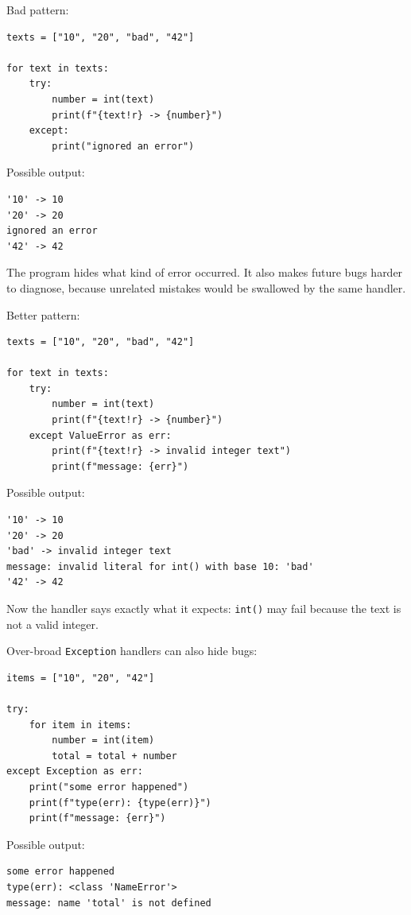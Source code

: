 \documentclass[a4paper,twoside]{report}
\begin{document}
Bad pattern:

\begin{verbatim}
texts = ["10", "20", "bad", "42"]

for text in texts:
    try:
        number = int(text)
        print(f"{text!r} -> {number}")
    except:
        print("ignored an error")
\end{verbatim}

Possible output:

\begin{verbatim}
'10' -> 10
'20' -> 20
ignored an error
'42' -> 42
\end{verbatim}

The program hides what kind of error occurred. It also makes future bugs harder to diagnose, because unrelated mistakes would be swallowed by the same handler.

Better pattern:

\begin{verbatim}
texts = ["10", "20", "bad", "42"]

for text in texts:
    try:
        number = int(text)
        print(f"{text!r} -> {number}")
    except ValueError as err:
        print(f"{text!r} -> invalid integer text")
        print(f"message: {err}")
\end{verbatim}

Possible output:

\begin{verbatim}
'10' -> 10
'20' -> 20
'bad' -> invalid integer text
message: invalid literal for int() with base 10: 'bad'
'42' -> 42
\end{verbatim}

Now the handler says exactly what it expects: \texttt{int()} may fail because the text is not a valid integer.

Over-broad \texttt{Exception} handlers can also hide bugs:

\begin{verbatim}
items = ["10", "20", "42"]

try:
    for item in items:
        number = int(item)
        total = total + number
except Exception as err:
    print("some error happened")
    print(f"type(err): {type(err)}")
    print(f"message: {err}")
\end{verbatim}

Possible output:

\begin{verbatim}
some error happened
type(err): <class 'NameError'>
message: name 'total' is not defined
\end{verbatim}
\end{document}
